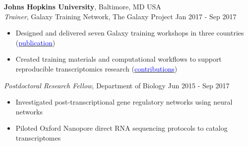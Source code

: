 \documentclass[margin,line]{res}
\begin{document}
\begin{resume}

{\bf Johns Hopkins University}, Baltimore, MD USA\\
{\em Trainer}, Galaxy Training Network, The Galaxy Project \hfill {Jan 2017 - Sep 2017}
\begin{itemize}
\itemsep0em 
	\item Designed and delivered seven Galaxy training workshops in three countries (\href{https://doi.org/10.1016/j.cels.2018.05.012}{\textcolor{blue}{publication}})
	\item Created training materials and computational workflows to support reproducible transcriptomics research (\href{https://training.galaxyproject.org/training-material/hall-of-fame/malloryfreeberg/}{\textcolor{blue}{contributions}})
\end{itemize}

{\em Postdoctoral Research Fellow}, Department of Biology \hfill {Jun 2015 - Sep 2017}
\begin{itemize}
\itemsep0em 
	\item Investigated post-transcriptional gene regulatory networks using neural networks
	\item Piloted Oxford Nanopore direct RNA sequencing protocols to catalog transcriptomes
\end{itemize}





\end{resume}
\end{document}
